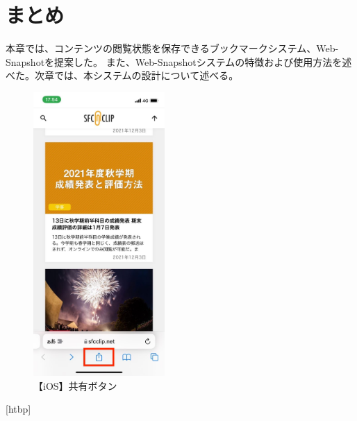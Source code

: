 \section{まとめ}
本章では、コンテンツの閲覧状態を保存できるブックマークシステム、Web-Snapshotを提案した。
また、Web-Snapshotシステムの特徴および使用方法を述べた。次章では、本システムの設計について述べる。

\begin{figure}[htbp]
\caption{【iOS】共有ボタン}
      \label{fig:usage-ios-share}
      \begin{center}
        \includegraphics[bb=0 0 585 1266,width=5cm]{img/030_web_snapshot_system/ios/usage-ios-share.pdf}
      \end{center}
\end{figure}[htbp]

